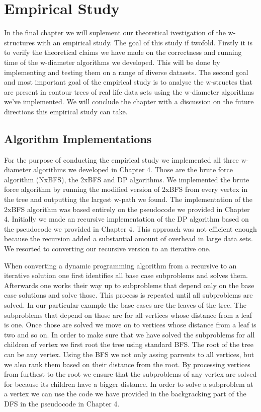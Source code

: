 \chapter{Empirical Study}
\label{chapter7}

In the final chapter we will suplement our theoretical ivestigation of the w-structures with an empirical study. The goal of this study if twofold. Firstly it is to verify the theoretical claims we have made on the correctness and running time of the w-diameter algorithms we developed. This will be done by implementing and testing them on a range of diverse datasets. The second goal and most important goal of the empirical study is to analyse the w-structes that are present in contour trees of real life data sets using the w-diameter algorithms we've implemented. We will conclude the chapter with a discussion on the future directions this empirical study can take.

\section{Algorithm Implementations}

For the purpose of conducting the empirical study we implemented all three w-diameter algorithms we developed in Chapter 4. Those are the brute force algorithm (NxBFS), the 2xBFS and DP algorithms.  We implemented the brute force algorithm by running the modified version of 2xBFS from every vertex in the tree and outputting the largest w-path we found. The implementation of the 2xBFS algorithm was based entirely on the pseudocode we provided in Chapter 4. Initially we made an recursive implementation of the DP algorithm based on the pseudocode we provided in Chapter 4. This approach was not efficient enough because the recursion added a substantial amount of overhead in large data sets. We resorted to converting our recursive version to an iterative one.

When converting a dynamic programming algorithm from a recursive to an iterative solution one first identifies all base case subproblems and solves them. Afterwards one works their way up to subproblems that depend only on the base case solutions and solve those. This process is repeated until all subproblems are solved. In our particular example the base cases are the leaves of the tree. The subproblems that depend on those are for all vertices whose distance from a leaf is one. Once those are solved we move on to vertices whose distance from a leaf is two and so on. In order to make sure that we have solved the subproblems for all children of vertex we first root the tree using standard BFS. The root of the tree can be any vertex. Using the BFS we not only assing parrents to all vertices, but we also rank them based on their distance from the root. By processing vertices from furthest to the root we ensure that the subproblems of any vertex are solved for because its children have a bigger distance. In order to solve a subproblem at a vertex we can use the code we have provided in the backgracking part of the DFS in the pseudocode in Chapter 4.


